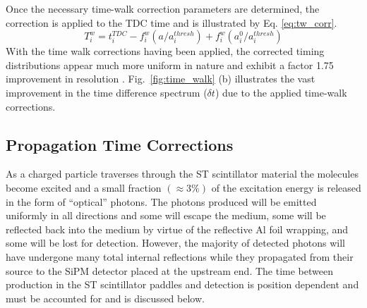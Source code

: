 Once the necessary time-walk correction parameters are determined, the correction is applied to the TDC time and is illustrated by Eq. \ref{eq:tw_corr}.
	\begin{equation} \label{eq:tw_corr}
		T^{w}_{i} = t^{TDC}_{i} - f^{w}_{i}(a/a^{thresh}_{i}) + f^{w}_{i}(a^{0}_{i}/a^{thresh}_{i})
	\end{equation}
With the time walk corrections having been applied, the corrected timing distributions appear much more uniform in nature and exhibit a factor 1.75 improvement in resolution \cite{pooser16}.  Fig.~\ref{fig:time_walk} (b) illustrates the vast improvement in the time difference spectrum ($\delta t$) due to the applied time-walk corrections.

\subsection{Propagation Time Corrections} \label{sec:calib_ptc}

As a charged particle traverses through the ST scintillator material the molecules become excited and a small fraction $(\approx 3\%)$ \cite{pdg_2012} of the excitation energy is released in the form of ``optical'' photons.  The photons produced will be emitted uniformly in all directions and some will escape the medium, some will be reflected back into the medium by virtue of the reflective Al foil wrapping, and some will be lost for detection.  However, the majority of detected  photons will have undergone many total internal reflections while they propagated from their source to the SiPM detector placed at the upstream end.  The time between production in the ST scintillator paddles and detection is position dependent and must be accounted for and is discussed below.

